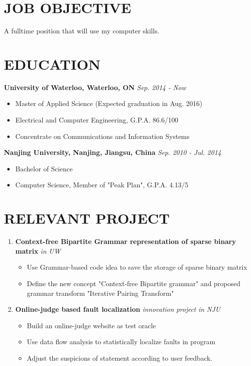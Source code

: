 \documentclass{res}
\begin{document}
\begin{resume}

\section{JOB OBJECTIVE}          
    A fulltime position that will use my computer skills.          
 
\section{EDUCATION}
  \textbf{University of Waterloo, Waterloo, ON} \hfill \emph{Sep. 2014 - Now}
  \begin{itemize}
    \item Master of Applied Science (Expected graduation in Aug. 2016) 
    \item Electrical and Computer Engineering, G.P.A. 86.6/100
    \item Concentrate on Communications and Information Systems
  \end{itemize}

  \textbf{Nanjing University, Nanjing, Jiangsu, China} \hfill \emph{Sep. 2010 - Jul. 2014}
  \begin{itemize}
    \item Bachelor of Science
    \item Computer Science, Member of "Peak Plan", G.P.A. 4.13/5
  \end{itemize}          

\section{RELEVANT PROJECT}
  \begin{enumerate}
    \item \textbf{Context-free Bipartite Grammar representation of sparse binary matrix} \hfill \emph{in UW}
    \begin{itemize}
      \item Use Grammar-based code idea to save the storage of sparse binary matrix
      \item Define the new concept "Context-free Bipartite grammar" and proposed grammar transform "Iterative Pairing Transform"
    \end{itemize}

    \item \textbf{Online-judge based fault localization} \hfill \emph{innovation project in NJU}
    \begin{itemize}
      \item Build an online-judge website as test oracle
      \item Use data flow analysis to statistically localize faults in program
      \item Adjust the suspicions of statement according to user feedback.
    \end{itemize}


\end{enumerate}
\end{resume}
\end{document}
